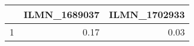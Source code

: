 \begin{table}[ht]
\centering
\begin{tabular}{rrr}
  \hline
 & ILMN\_1689037 & ILMN\_1702933 \\ 
  \hline
1 & 0.17 & 0.03 \\ 
   \hline
\end{tabular}
\end{table}
